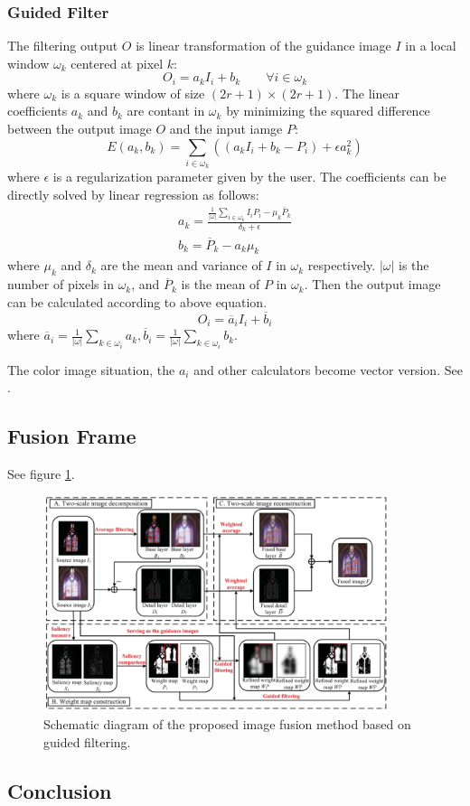 \subsubsection{Guided Filter}
The filtering output $O$ is linear transformation of the guidance image $I$ in a local window $\omega_k$ centered at pixel $k$:
\begin{displaymath}
O_i = a_k I_i + b_k \qquad \forall i \in \omega_k
\end{displaymath}
where $\omega_k$ is a square window of size $(2r+1) \times (2r+1)$. The linear coefficients $a_k$ and $b_k$ are contant in $\omega_k$ by minimizing the squared difference between the output image $O$ and the input iamge $P$:
\begin{displaymath}
E(a_k, b_k) = \sum_{i \in \omega_k}\left( (a_kI_i + b_k - P_i) + \epsilon a_k^2 \right)
\end{displaymath}
where $\epsilon$ is a regularization parameter given by the user.
The coefficients can be directly solved by linear regression as follows:
\begin{gather*}
a_k = \frac{\frac{1}{|\omega|}\sum_{i \in \omega_k}I_iP_i -  \mu_k \overline{P}_k}{\delta_k + \epsilon}
\\
b_k = \overline{P}_k - a_k \mu_k
\end{gather*}
where $\mu_k$ and $\delta_k$ are the mean and variance of $I$ in $\omega_k$ respectively. $|\omega|$ is the number of pixels in $\omega_k$, and $\overline{P}_k$ is the mean of $P$ in $\omega_k$. Then the output image can be calculated according to above equation.
\begin{displaymath}
O_i = \overline{a}_iI_i + \overline{b}_i
\end{displaymath}
where \(\overline{a}_i = \frac{1}{|\omega|}\sum_{k \in \omega_i}a_k, \overline{b}_i = \frac{1}{|\omega|}\sum_{k \in \omega_i}b_k \). 

The color image situation, the $a_i$ and other calculators become vector version. See \cite{li2013image}.

\subsection{Fusion Frame}
See figure \ref{fig2.1}.
\begin{figure}[!hbpt]
\centering
\includegraphics[width=0.9\textwidth]{ImageFusion/ImageFusionGuidedFilter1}
\caption{Schematic diagram of the proposed image fusion method based on guided filtering.}
\label{fig2.1}
\end{figure}

\subsection{Conclusion}